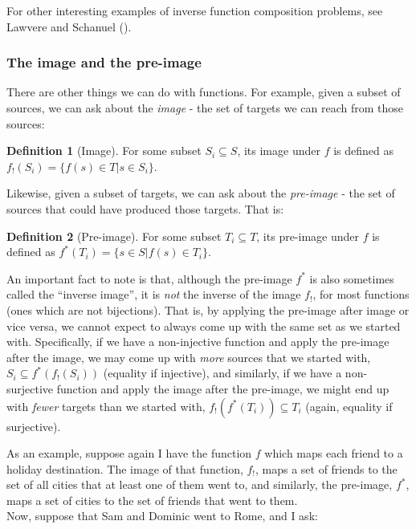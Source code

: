 \documentclass[
]{book}
\theoremstyle{definition}
\newtheorem{definition}{Definition}[chapter]
\theoremstyle{definition}
\theoremstyle{definition}
\theoremstyle{definition}
\theoremstyle{remark}
\begin{document}
For other interesting examples of inverse function composition problems, see Lawvere and Schanuel ().

\subsubsection{The image and the pre-image}\label{the-image-and-the-pre-image}

There are other things we can do with functions. For example, given a subset of sources, we can ask about the \emph{image} - the set of targets we can reach from those sources:

\begin{definition}[Image]
For some subset \(S_i \subseteq S\), its image under \(f\) is defined as \(f_!(S_i) = \{ f(s) \in T \lvert s \in S_i \}\).
\end{definition}

Likewise, given a subset of targets, we can ask about the \emph{pre-image} - the set of sources that could have produced those targets. That is:

\begin{definition}[Pre-image]
For some subset \(T_i \subseteq T\), its pre-image under \(f\) is defined as \(f^*(T_i) = \{ s \in S \lvert f(s) \in T_i \}\).
\end{definition}

An important fact to note is that, although the pre-image \(f^*\) is also sometimes called the ``inverse image'', it is \emph{not} the inverse of the image \(f_!\), for most functions (ones which are not bijections). That is, by applying the pre-image after image or vice versa, we cannot expect to always come up with the same set as we started with. Specifically, if we have a non-injective function and apply the pre-image after the image, we may come up with \emph{more} sources that we started with, \(S_i \subseteq f^*(f_!(S_i))\) (equality if injective), and similarly, if we have a non-surjective function and apply the image after the pre-image, we might end up with \emph{fewer} targets than we started with, \(f_!(f^*(T_i)) \subseteq T_i\) (again, equality if surjective).

As an example, suppose again I have the function \(f\) which maps each friend to a holiday destination. The image of that function, \(f_!\), maps a set of friends to the set of all cities that at least one of them went to, and similarly, the pre-image, \(f^*\), maps a set of cities to the set of friends that went to them.\\
Now, suppose that Sam and Dominic went to Rome, and I ask:
\end{document}
